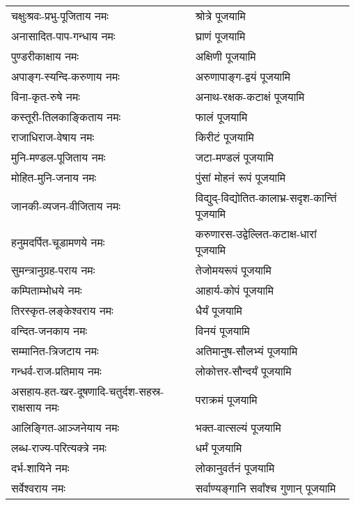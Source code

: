 \begin{center}
\begin{supertabular}{p{0.525\linewidth}p{0.45\linewidth}}
चक्षुःश्रवः-प्रभु-पूजिताय नमः & श्रोत्रे पूजयामि \\
अनासादित-पाप-गन्धाय नमः & घ्राणं पूजयामि \\
पुण्डरीकाक्षाय नमः & अक्षिणी पूजयामि \\
अपाङ्ग-स्यन्दि-करुणाय नमः & अरुणापाङ्ग-द्वयं पूजयामि \\
विना-कृत-रुषे नमः & अनाथ-रक्षक-कटाक्षं पूजयामि \\
कस्तूरी-तिलकाङ्किताय नमः & फालं पूजयामि \\
राजाधिराज-वेषाय नमः & किरीटं पूजयामि \\
मुनि-मण्डल-पूजिताय नमः & जटा-मण्डलं पूजयामि \\
मोहित-मुनि-जनाय नमः & पुंसां मोहनं रूपं पूजयामि \\
जानकी-व्यजन-वीजिताय नमः & विद्युद्-विद्योतित-कालाभ्र-सदृश-कान्तिं पूजयामि \\
हनुमदर्पित-चूडामणये नमः & करुणारस-उद्वेल्लित-कटाक्ष-धारां पूजयामि \\
सुमन्त्रानुग्रह-पराय नमः & तेजोमयरूपं पूजयामि \\
कम्पिताम्भोधये नमः & आहार्य-कोपं पूजयामि \\
तिरस्कृत-लङ्केश्वराय नमः & धैर्यं पूजयामि \\
वन्दित-जनकाय नमः & विनयं पूजयामि \\
सम्मानित-त्रिजटाय नमः & अतिमानुष-सौलभ्यं पूजयामि \\
गन्धर्व-राज-प्रतिमाय नमः & लोकोत्तर-सौन्दर्यं पूजयामि \\
असहाय-हत-खर-दूषणादि-चतुर्दश-सहस्र-राक्षसाय नमः & पराक्रमं पूजयामि \\
आलिङ्गित-आञ्जनेयाय नमः & भक्त-वात्सल्यं पूजयामि \\
लब्ध-राज्य-परित्यक्त्रे नमः & धर्मं पूजयामि \\
दर्भ-शायिने नमः & लोकानुवर्तनं पूजयामि \\
सर्वेश्वराय नमः & सर्वाण्यङ्गानि सर्वांश्च गुणान् पूजयामि \\
\end{supertabular}

\begingroup
\setlength{\columnseprule}{1pt}
\let\chapt\sect
\centering






\endgroup



\end{center}
